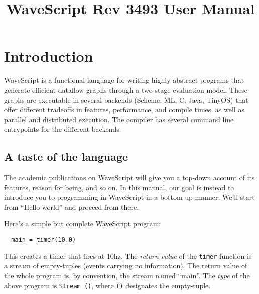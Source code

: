 \documentclass[twocolumn]{report}
\title{WaveScript Rev 3493 User Manual}
\newcommand{\rednote}[1]{{\textcolor{blue}{#1}}}
\newcommand{\cde}{\tt}
\newcommand{\ws}{WaveScript}
\begin{document}
\maketitle


\tableofcontents
\clearpage

\chapter{Introduction}


WaveScript is a functional language for writing highly abstract
programs that generate efficient dataflow graphs through a two-stage
evaluation model.  These graphs are executable in several backends
(Scheme, ML, C, Java, TinyOS) that offer different tradeoffs in
features, performance, and compile times, as well as parallel and
distributed execution.  The compiler has several command line
entrypoints for the different backends.


\section{A taste of the language}\label{s:taste}

The academic publications on WaveScript will give you a top-down
account of its features, reason for being, and so on.  In this manual,
our goal is instead to introduce you to programming in WaveScript in a
bottom-up manner.  We'll start from ``Hello-world'' and proceed from
there.

Here's a simple but complete {\ws} program:
\begin{verbatim}
  main = timer(10.0)
\end{verbatim}
This creates a timer that fires at 10hz.  The {\em return value} of
the {\cde timer} function is a stream of empty-tuples (events carrying
no information).  The return value of the whole program is, by
convention, the stream named ``main''.  The {\em type} of the above
program is {\cde Stream ()}, where {\cde ()} designates the empty-tuple.
\end{document}
